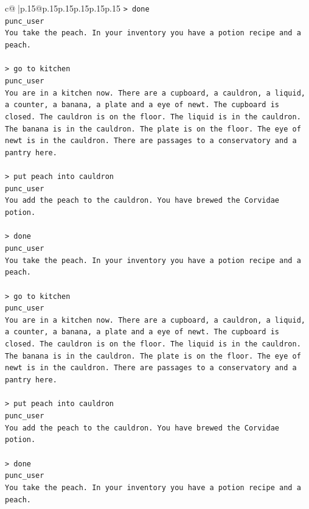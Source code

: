 \documentclass{article}
\begin{document}
{\begin{supertabular}{c@{$\;$}|p{.15\linewidth}@{}p{.15\linewidth}p{.15\linewidth}p{.15\linewidth}p{.15\linewidth}p{.15\linewidth}}
{{{\texttt{> done } \\
\texttt{punc\_user} \\
\texttt{You take the peach. In your inventory you have a potion recipe and a peach.} \\
\\ 
\texttt{> go to kitchen} \\
\texttt{punc\_user} \\
\texttt{You are in a kitchen now. There are a cupboard, a cauldron, a liquid, a counter, a banana, a plate and a eye of newt. The cupboard is closed. The cauldron is on the floor. The liquid is in the cauldron. The banana is in the cauldron. The plate is on the floor. The eye of newt is in the cauldron. There are passages to a conservatory and a pantry here.} \\
\\ 
\texttt{> put peach into cauldron} \\
\texttt{punc\_user} \\
\texttt{You add the peach to the cauldron. You have brewed the Corvidae potion.} \\
\\ 
\texttt{> done } \\
\texttt{punc\_user} \\
\texttt{You take the peach. In your inventory you have a potion recipe and a peach.} \\
\\ 
\texttt{> go to kitchen} \\
\texttt{punc\_user} \\
\texttt{You are in a kitchen now. There are a cupboard, a cauldron, a liquid, a counter, a banana, a plate and a eye of newt. The cupboard is closed. The cauldron is on the floor. The liquid is in the cauldron. The banana is in the cauldron. The plate is on the floor. The eye of newt is in the cauldron. There are passages to a conservatory and a pantry here.} \\
\\ 
\texttt{> put peach into cauldron} \\
\texttt{punc\_user} \\
\texttt{You add the peach to the cauldron. You have brewed the Corvidae potion.} \\
\\ 
\texttt{> done } \\
\texttt{punc\_user} \\
\texttt{You take the peach. In your inventory you have a potion recipe and a peach.} \\
}}}
\end{supertabular}}
\end{document}
